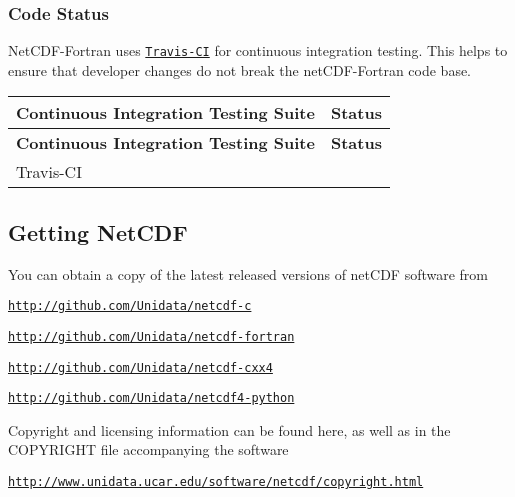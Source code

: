 \subsubsection*{Code Status}

Net\+C\+D\+F-\/\+Fortran uses \href{http://travis-ci.org}{\tt Travis-\/\+CI} for continuous integration testing. This helps to ensure that developer changes do not break the net\+C\+D\+F-\/\+Fortran code base.

\tabulinesep=1mm
\begin{longtabu} spread 0pt [c]{*{2}{|X[-1]}|}
\hline
\rowcolor{\tableheadbgcolor}\textbf{ Continuous Integration Testing Suite }&\textbf{ Status  }\\
\endfirsthead
\hline
\endfoot
\hline
\rowcolor{\tableheadbgcolor}\textbf{ Continuous Integration Testing Suite }&\textbf{ Status  }\\
\endhead
Travis-\/\+CI & \\
\end{longtabu}


\subsection*{Getting Net\+C\+DF }

You can obtain a copy of the latest released versions of net\+C\+DF software from


\begin{DoxyItemize}
\item \href{http://github.com/Unidata/netcdf-c}{\tt http\+://github.\+com/\+Unidata/netcdf-\/c}
\item \href{http://github.com/Unidata/netcdf-fortran}{\tt http\+://github.\+com/\+Unidata/netcdf-\/fortran}
\item \href{http://github.com/Unidata/netcdf-cxx4}{\tt http\+://github.\+com/\+Unidata/netcdf-\/cxx4}
\item \href{http://github.com/Unidata/netcdf4-python}{\tt http\+://github.\+com/\+Unidata/netcdf4-\/python}
\end{DoxyItemize}

Copyright and licensing information can be found here, as well as in the C\+O\+P\+Y\+R\+I\+G\+HT file accompanying the software


\begin{DoxyItemize}
\item \href{http://www.unidata.ucar.edu/software/netcdf/copyright.html}{\tt http\+://www.\+unidata.\+ucar.\+edu/software/netcdf/copyright.\+html}
\end{DoxyItemize}

